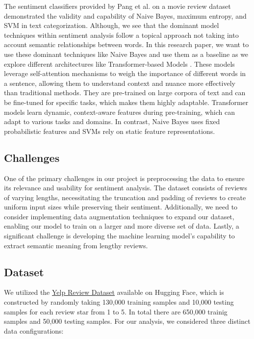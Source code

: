 \documentclass[12pt]{article}
\begin{document}
The sentiment classifiers provided by Pang et al. \citep{pang2008sentiment} on a movie review dataset demonstrated the validity and capability of Naive Bayes, maximum entropy, and SVM in text categorization. Although, we see that the dominant model techniques within sentiment analysis follow a topical approach not taking into account semantic relationships between words. In this research paper, we want to use these dominant techniques like Naive Bayes and use them as a baseline as we explore different architectures like Transformer-based Models \citep{kokab2022transformer}. These models leverage self-attention mechanisms to weigh the importance of different words in a sentence, allowing them to understand context and nuance more effectively than traditional methods. They are pre-trained on large corpora of text and can be fine-tuned for specific tasks, which makes them highly adaptable. Transformer models learn dynamic, context-aware features during pre-training, which can adapt to various tasks and domains. In contrast, Naive Bayes uses fixed probabilistic features and SVMs rely on static feature representations. 


\subsection{Challenges}
One of the primary challenges in our project is preprocessing the data to ensure its relevance and usability for sentiment analysis. The dataset consists of reviews of varying lengths, necessitating the truncation and padding of reviews to create uniform input sizes while preserving their sentiment. Additionally, we need to consider implementing data augmentation techniques to expand our dataset, enabling our model to train on a larger and more diverse set of data. Lastly, a significant challenge is developing the machine learning model's capability to extract semantic meaning from lengthy reviews.

\subsection{Dataset}
We utilized the \href{https://huggingface.co/datasets/Yelp/yelp_review_full}{Yelp Review Dataset} available on Hugging Face, which is constructed by randomly taking 130,000 training samples and 10,000 testing samples for each review star from 1 to 5. In total there are 650,000 trainig samples and 50,000 testing samples. For our analysis, we considered three distinct data configurations:
\end{document}
